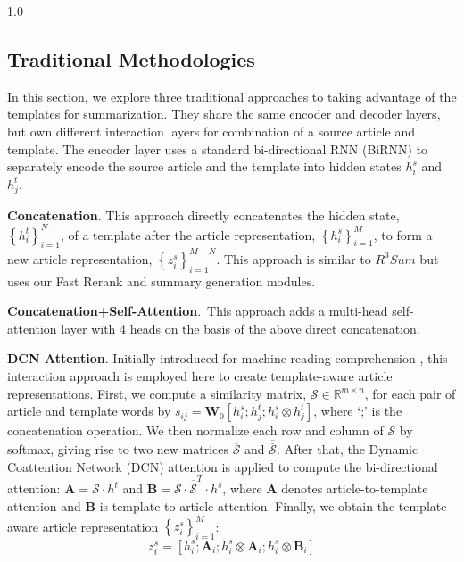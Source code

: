 \documentclass[11pt,a4paper]{article}
\begin{document}
\begin{spacing}{1.0}

\subsection{Traditional Methodologies}\label{section:interaction_methods}
In this section, we explore three traditional approaches to taking advantage of the templates for summarization. They share the same encoder and decoder layers, but own different interaction layers for combination of a source article and template. The encoder layer uses a standard bi-directional RNN (BiRNN) to separately encode the source article and the template into hidden states $h_i^s$ and $h_j^t$.

\noindent\textbf{Concatenation}. This approach directly concatenates the hidden state, $\left \{ h _{i}^t \right \}_{i=1}^{N}$, of a template after the article representation, $\left \{ h _{i}^s \right \}_{i=1}^{M}$, to form a new article representation, $\left \{ z _{i}^s \right \}_{i=1}^{M+N}$. This approach is similar to $R^3Sum$ \cite{cao2018retrieve} but uses our Fast Rerank and summary generation modules.

\noindent\textbf{Concatenation+Self-Attention}.~This approach adds a multi-head self-attention  \cite{Vaswani2017Attention} layer with 4 heads on the basis of the above direct concatenation.

\noindent\textbf{DCN Attention}. Initially introduced for machine reading comprehension \cite{seo2016bidirectional}, this interaction approach is employed here to create template-aware article representations. First, we compute a similarity matrix, $\mathcal{S}\in \mathbb{R}^{m\times n}$, for each pair of article and template words by $s_{ij}=\textbf{W}_0[h_i^s;h_j^t;h_i^s\otimes h_j^t]$, where `;' is the concatenation operation. We then normalize each row and column of $\mathcal{S}$ by softmax, giving rise to two new matrices $\overline{\mathcal{S}}$ and $\overline{\overline{\mathcal{S}}}$. After that, the Dynamic Coattention Network (DCN) attention is applied to compute the bi-directional attention: $\textbf{A}=\overline{\mathcal{S}}\cdot h^t$ and $\textbf{B}=\overline{\mathcal{S}}\cdot \overline{\overline{\mathcal{S}}}^T\cdot h^s$, where $\textbf{A}$ denotes article-to-template attention and $\textbf{B}$ is template-to-article attention. Finally, we obtain the template-aware article representation $\left \{ z _{i}^s \right \}_{i=1}^{M}$:
\begin{equation}
z_i^s=[h_i^s;\textbf{A}_i;h_i^s\otimes \textbf{A}_i;h_i^s\otimes \textbf{B}_i]
\end{equation}


\end{spacing}
\end{document}
